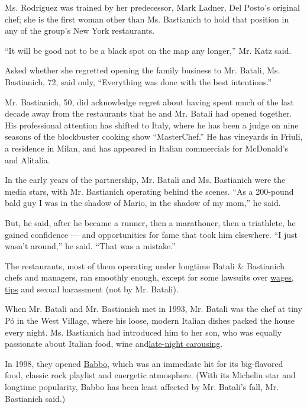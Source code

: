 Ms. Rodriguez was trained by her predecessor, Mark Ladner, Del Posto's
original chef; she is the first woman other than Ms. Bastianich to hold
that position in any of the group's New York restaurants.

``It will be good not to be a black spot on the map any longer,'' Mr.
Katz said.

Asked whether she regretted opening the family business to Mr. Batali,
Ms. Bastianich, 72, said only, ``Everything was done with the best
intentions.''

Mr. Bastianich, 50, did acknowledge regret about having spent much of
the last decade away from the restaurants that he and Mr. Batali had
opened together. His professional attention has shifted to Italy, where
he has been a judge on nine seasons of the blockbuster cooking show
``MasterChef.'' He has vineyards in Friuli, a residence in Milan, and
has appeared in Italian commercials for McDonald's and Alitalia.

In the early years of the partnership, Mr. Batali and Ms. Bastianich
were the media stars, with Mr. Bastianich operating behind the scenes.
``As a 200-pound bald guy I was in the shadow of Mario, in the shadow of
my mom,'' he said.

But, he said, after he became a runner, then a marathoner, then a
triathlete, he gained confidence --- and opportunities for fame that
took him elsewhere. ``I just wasn't around,'' he said. ``That was a
mistake.''

The restaurants, most of them operating under longtime Batali \&
Bastianich chefs and managers, ran smoothly enough, except for some
lawsuits over
\href{https://dinersjournal.blogs.nytimes.com/2012/09/24/del-posto-to-pay-1-15-million-to-settle-workers-suit/}{wages,
tips} and sexual harassment (not by Mr. Batali).

When Mr. Batali and Mr. Bastianich met in 1993, Mr. Batali was the chef
at tiny Pó in the West Village, where his loose, modern Italian dishes
packed the house every night. Ms. Bastianich had introduced him to her
son, who was equally passionate about Italian food, wine
and\href{https://www.vanityfair.com/culture/2012/04/joe-bastianich-restaurant-man-book-excerpt-mario-batali-stoned-babbo}{late-night
carousing}.

In 1998, they opened
\href{https://www.nytimes.com/1998/08/26/dining/restaurants-a-radical-departure-with-sure-footing.html}{Babbo},
which was an immediate hit for its big-flavored food, classic rock
playlist and energetic atmosphere. (With its Michelin star and longtime
popularity, Babbo has been least affected by Mr. Batali's fall, Mr.
Bastianich said.)

